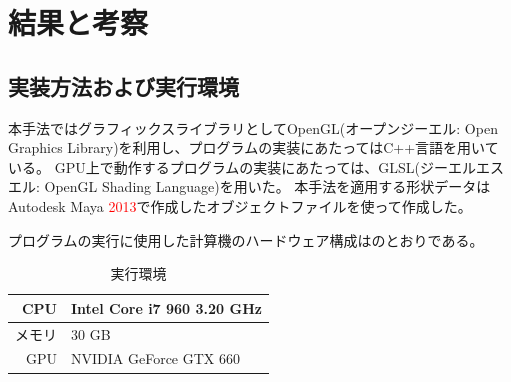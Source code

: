 \chapter{結果と考察}
\label{CResult}


\section{実装方法および実行環境}
\label{SEnvironment}

本手法ではグラフィックスライブラリとしてOpenGL(オープンジーエル: Open Graphics Library)を利用し、プログラムの実装にあたってはC++言語を用いている。
GPU上で動作するプログラムの実装にあたっては、GLSL(ジーエルエスエル: OpenGL Shading Language)を用いた。
本手法を適用する形状データはAutodesk Maya \textcolor{red}{2013}で作成したオブジェクトファイルを使って作成した。

プログラムの実行に使用した計算機のハードウェア構成はのとおりである。

\begin{table}
\centering
\caption{実行環境 \label{tab:experiment-hadrware}}
\begin{tabular}{r|l}
\hline
CPU & Intel Core i7 960 3.20 GHz \\ \hline
メモリ & 30 GB \\ \hline
GPU & NVIDIA GeForce GTX 660 \\ \hline
\end{tabular}
\end{table}

